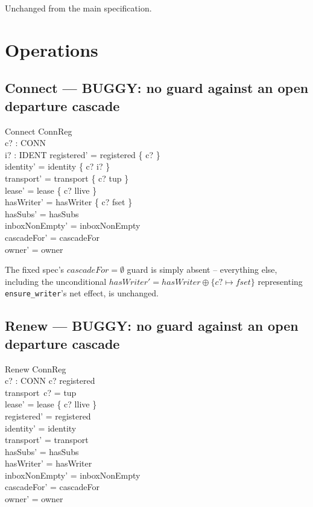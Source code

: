 \documentclass[a4paper,10pt,fleqn]{article}
\begin{document}
Unchanged from the main specification.

\section{Operations}

\subsection{Connect --- BUGGY: no guard against an open departure cascade}
\label{sec:connect}

\begin{schema}{Connect}
  \Delta ConnReg \\
  c? : CONN \\
  i? : IDENT
\where
  registered' = registered \cup \{ c? \} \\
  identity' = identity \oplus \{ c? \mapsto i? \} \\
  transport' = transport \oplus \{ c? \mapsto tup \} \\
  lease' = lease \oplus \{ c? \mapsto llive \} \\
  hasWriter' = hasWriter \oplus \{ c? \mapsto fset \} \\
  hasSubs' = hasSubs \\
  inboxNonEmpty' = inboxNonEmpty \\
  cascadeFor' = cascadeFor \\
  owner' = owner
\end{schema}

The fixed spec's \texttt{$cascadeFor = \emptyset$} guard is simply absent
-- everything else, including the unconditional
\texttt{$hasWriter' = hasWriter \oplus \{c? \mapsto fset\}$} representing
\texttt{ensure\_writer}'s net effect, is unchanged.

\subsection{Renew --- BUGGY: no guard against an open departure cascade}
\label{sec:renew}

\begin{schema}{Renew}
  \Delta ConnReg \\
  c? : CONN
\where
  c? \in registered \\
  transport~c? = tup \\
  lease' = lease \oplus \{ c? \mapsto llive \} \\
  registered' = registered \\
  identity' = identity \\
  transport' = transport \\
  hasSubs' = hasSubs \\
  hasWriter' = hasWriter \\
  inboxNonEmpty' = inboxNonEmpty \\
  cascadeFor' = cascadeFor \\
  owner' = owner
\end{schema}
\end{document}
